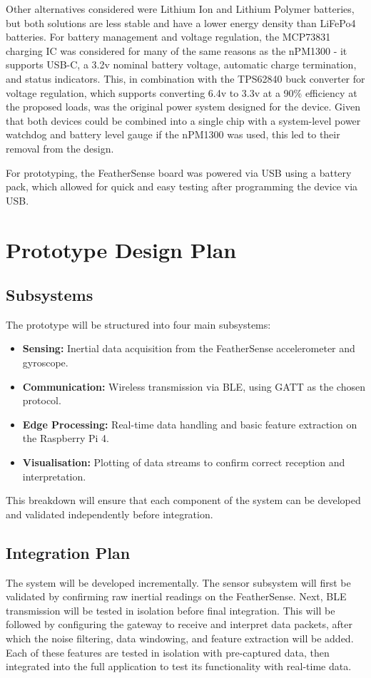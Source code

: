 \documentclass[conference]{IEEEtran}
\begin{document}
Other alternatives considered were Lithium Ion and Lithium Polymer batteries, but both solutions are less stable and have a lower energy density than LiFePo4 batteries. For battery management and voltage regulation, the MCP73831 charging IC was considered for many of the same reasons as the nPM1300 - it supports USB-C, a 3.2v nominal battery voltage, automatic charge termination, and status indicators. This, in combination with the TPS62840 buck converter for voltage regulation, which supports converting 6.4v to 3.3v at a 90\% efficiency at the proposed loads, was the original power system designed for the device. Given that both devices could be combined into a single chip with a system-level power watchdog and battery level gauge if the nPM1300 was used, this led to their removal from the design.

For prototyping, the FeatherSense board was powered via USB using a battery pack, which allowed for quick and easy testing after programming the device via USB. 

\section{Prototype Design Plan}

\subsection{Subsystems}
The prototype will be structured into four main subsystems: 
\begin{itemize}
	\item \textbf{Sensing:} Inertial data acquisition from the FeatherSense accelerometer and gyroscope. 
	\item \textbf{Communication:} Wireless transmission via BLE, using GATT as the chosen protocol. 
	\item \textbf{Edge Processing:} Real-time data handling and basic feature extraction on the Raspberry Pi 4. 
	\item \textbf{Visualisation:} Plotting of data streams to confirm correct reception and interpretation. 
\end{itemize}
This breakdown will ensure that each component of the system can be developed and validated independently before integration. 

\subsection{Integration Plan}
The system will be developed incrementally. The sensor subsystem will first be validated by confirming raw inertial readings on the FeatherSense. Next, BLE transmission will be tested in isolation before final integration. This will be followed by configuring the gateway to receive and interpret data packets, after which the noise filtering, data windowing, and feature extraction will be added. Each of these features are tested in isolation with pre-captured data, then integrated into the full application to test its functionality with real-time data. 
\end{document}
